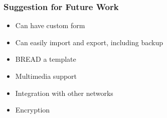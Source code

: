 \documentclass[10pt, compress]{beamer}
\begin{document}
\begin{frame}[fragile]
  \frametitle{Suggestion for Future Work}

  \begin{itemize} \itemsep0pt
    \item Can have custom form
    \item Can easily import and export, including backup
    \item \textsc{BREAD} a template
    \item Multimedia support
    \item Integration with other networks
    \item Encryption
  \end{itemize}

\end{frame}



\end{document}
